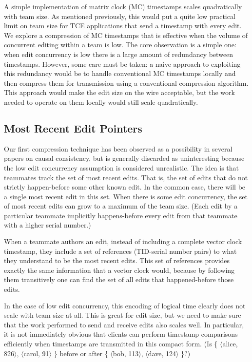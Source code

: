 \documentclass[runningheads]{llncs}
\begin{document}
A simple implementation of matrix clock (MC) timestamps scales quadratically with team size.
As mentioned previously, this would put a quite low practical limit on team size for TCE applications that send a timestamp with every edit.
We explore a compression of MC timestamps that is effective when the volume of concurrent editing within a team is low.
The core observation is a simple one: when edit concurrency is low there is a large amount of redundancy between timestamps.
However, some care must be taken: a naive approach to exploiting this redundancy would be to handle conventional MC timestamps locally and then compress them for transmission using a conventional compression algorithm.
This approach would make the edit size on the wire acceptable, but the work needed to operate on them locally would still scale quadratically.

\subsection{Most Recent Edit Pointers}

Our first compression technique has been observed as a possibility in several papers on causal consistency, but is generally discarded as uninteresting because the low edit concurrency assumption is considered unrealistic.
The idea is that teammates track the set of most recent edits.
That is, the set of edits that do not strictly happen-before some other known edit.
In the common case, there will be a single most recent edit in this set.
When there is some edit concurrency, the set of most recent edits can grow to a maximum of the team size.
(Each edit by a particular teammate implicitly happens-before every edit from that teammate with a higher serial number.)

When a teammate authors an edit, instead of including a complete vector clock timestamp, they include a set of references (TID-serial number pairs) to what they understand to be the most recent edits.
This set of references provides exactly the same information that a vector clock would, because by following them transitively one can find the set of all edits that happened-before those edits.

In the case of low edit concurrency, this encoding of logical time clearly does not scale with team size at all.
This is great for edit size, but we need to make sure that the work performed to send and receive edits also scales well.
In particular, it is not immediately obvious that clients can perform timestamp comparisons efficiently when timestamps are transmitted in this compact form.
(Is \{ $\langle$alice, 826$\rangle$, $\langle$carol, 91$\rangle$ \} before or after \{ $\langle$bob, 113$\rangle$, $\langle$dave, 124$\rangle$ \}?)
\end{document}

